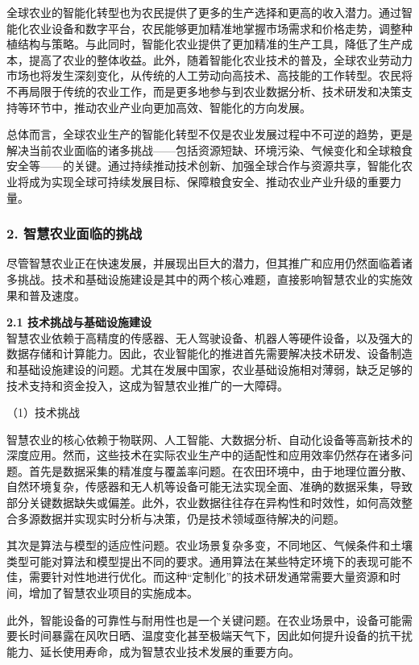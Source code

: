 全球农业的智能化转型也为农民提供了更多的生产选择和更高的收入潜力。通过智能化农业设备和数字平台，农民能够更加精准地掌握市场需求和价格走势，调整种植结构与策略。与此同时，智能化农业提供了更加精准的生产工具，降低了生产成本，提高了农业的整体收益。此外，随着智能化农业技术的普及，全球农业劳动力市场也将发生深刻变化，从传统的人工劳动向高技术、高技能的工作转型。农民将不再局限于传统的农业工作，而是更多地参与到农业数据分析、技术研发和决策支持等环节中，推动农业产业向更加高效、智能化的方向发展。

总体而言，全球农业生产的智能化转型不仅是农业发展过程中不可逆的趋势，更是解决当前农业面临的诸多挑战——包括资源短缺、环境污染、气候变化和全球粮食安全等——的关键。通过持续推动技术创新、加强全球合作与资源共享，智能化农业将成为实现全球可持续发展目标、保障粮食安全、推动农业产业升级的重要力量。

\subsubsection{2. 智慧农业面临的挑战}

尽管智慧农业正在快速发展，并展现出巨大的潜力，但其推广和应用仍然面临着诸多挑战。技术和基础设施建设是其中的两个核心难题，直接影响智慧农业的实施效果和普及速度。

\textbf{2.1 技术挑战与基础设施建设} \\
智慧农业依赖于高精度的传感器、无人驾驶设备、机器人等硬件设备，以及强大的数据存储和计算能力。因此，农业智能化的推进首先需要解决技术研发、设备制造和基础设施建设的问题。尤其在发展中国家，农业基础设施相对薄弱，缺乏足够的技术支持和资金投入，这成为智慧农业推广的一大障碍。

（1）技术挑战

智慧农业的核心依赖于物联网、人工智能、大数据分析、自动化设备等高新技术的深度应用。然而，这些技术在实际农业生产中的适配性和应用效率仍然存在诸多问题。首先是数据采集的精准度与覆盖率问题。在农田环境中，由于地理位置分散、自然环境复杂，传感器和无人机等设备可能无法实现全面、准确的数据采集，导致部分关键数据缺失或偏差。此外，农业数据往往存在异构性和时效性，如何高效整合多源数据并实现实时分析与决策，仍是技术领域亟待解决的问题。

其次是算法与模型的适应性问题。农业场景复杂多变，不同地区、气候条件和土壤类型可能对算法和模型提出不同的要求。通用算法在某些特定环境下的表现可能不佳，需要针对性地进行优化。而这种“定制化”的技术研发通常需要大量资源和时间，增加了智慧农业项目的实施成本。

此外，智能设备的可靠性与耐用性也是一个关键问题。在农业场景中，设备可能需要长时间暴露在风吹日晒、温度变化甚至极端天气下，因此如何提升设备的抗干扰能力、延长使用寿命，成为智慧农业技术发展的重要方向。

